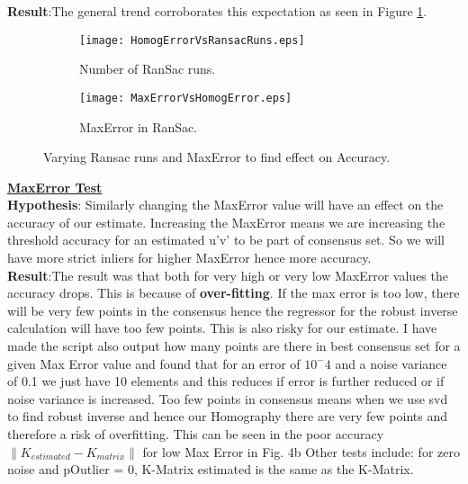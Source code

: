 \documentclass[titlepage]{article}
\begin{document}
\textbf{Result}:The general trend corroborates this expectation as seen in Figure \ref{RansacRunsVsAccuracy}.
\begin{figure}[H]
\begin{center}
\begin{subfigure}{0.25\textwidth}
\texttt{[image: HomogErrorVsRansacRuns.eps]}
\caption{Number of RanSac runs.}
\label{RansacRunsVsAccuracy}
\end{subfigure}\hspace{2cm}
\begin{subfigure}{0.25\textwidth}
\texttt{[image: MaxErrorVsHomogError.eps]}
\caption{MaxError in RanSac.}
\label{MaxErrorVsAccuracy}
\end{subfigure} 
\caption{Varying Ransac runs and MaxError to find effect on Accuracy.}
\end{center}
\end{figure}
\textbf{\underline{MaxError Test}}\\
\textbf{Hypothesis}: Similarly changing the MaxError value will have an effect on the accuracy of our estimate. Increasing the MaxError means we are increasing the threshold accuracy for an estimated u'v' to be part of consensus set. So we will have more strict inliers for higher MaxError hence more accuracy.\\

\textbf{Result}:The result was that both for very high or very low MaxError values the accuracy drops. This is because of \textbf{over-fitting}. If the max error is too low, there will be very few points in the consensus hence the regressor for the robust inverse calculation will have too few points. This is also risky for our estimate. I have made the script also output how many points are there in best consensus set for a given Max Error value and found that for an error of $10^-4$ and a noise variance of 0.1 we just have 10 elements and this reduces if error is further reduced or if noise variance is increased. Too few points in consensus means when we use svd to find robust inverse and hence our Homography there are very few points and therefore a risk of overfitting. This can be seen in the poor accuracy $\|K_{estimated} - K_{matrix}\|$ for low Max Error in Fig. 4b 
%
Other tests include: for zero noise and pOutlier = 0, K-Matrix estimated is the same as the K-Matrix.
\bigskip
\end{document}
